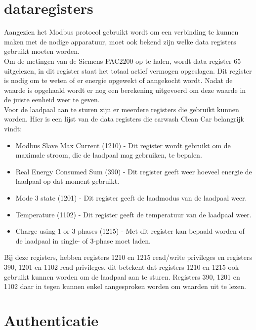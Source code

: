 \section{dataregisters}
\label{sec:stand-van-zaken-dataregisters}

Aangezien het Modbus protocol gebruikt wordt om een verbinding te kunnen maken met de nodige apparatuur, moet ook bekend zijn welke data registers gebruikt moeten worden.\\

Om de metingen van de Siemens PAC2200 op te halen, wordt data register 65 uitgelezen, in dit register staat het totaal actief vermogen opgeslagen. Dit register is nodig om te weten of er energie opgewekt of aangekocht wordt. Nadat de waarde is opgehaald wordt er nog een berekening uitgevoerd om deze waarde in de juiste eenheid weer te geven.\\

Voor de laadpaal aan te sturen zijn er meerdere registers die gebruikt kunnen worden. Hier is een lijst van de data registers die carwash Clean Car belangrijk vindt:

\begin{itemize}
    \item Modbus Slave Max Current (1210) - Dit register wordt gebruikt om de maximale stroom, die de laadpaal mag gebruiken, te bepalen.
    \item Real Energy Consumed Sum (390) - Dit register geeft weer hoeveel energie de laadpaal op dat moment gebruikt.
    \item Mode 3 state (1201) - Dit register geeft de laadmodus van de laadpaal weer.
    \item Temperature (1102) - Dit register geeft de temperatuur van de laadpaal weer.
    \item Charge using 1 or 3 phases (1215) - Met dit register kan bepaald worden of de laadpaal in single- of 3-phase moet laden.
\end{itemize}

Bij deze registers, hebben registers 1210 en 1215 read/write privileges en registers 390, 1201 en 1102 read privileges, dit betekent dat registers 1210 en 1215 ook gebruikt kunnen worden om de laadpaal aan te sturen. Registers 390, 1201 en 1102 daar in tegen kunnen enkel aangesproken worden om waarden uit te lezen.

\section{Authenticatie}
\label{sec:stand-van-zaken-authenticatie}


